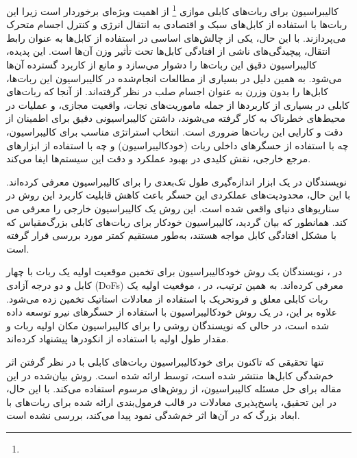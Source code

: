  کالیبراسیون برای ربات‌های کابلی موازی
  \footnote{}
  از اهمیت ویژه‌ای برخوردار است زیرا این ربات‌ها با استفاده از کابل‌های سبک و اقتصادی به انتقال انرژی و کنترل اجسام متحرک می‌پردازند. با این حال، یکی از چالش‌های اساسی در استفاده از کابل‌ها به عنوان رابط انتقال، پیچیدگی‌های ناشی از افتادگی کابل‌ها تحت تأثیر وزن آن‌ها است. این پدیده، کالیبراسیون دقیق این ربات‌ها را دشوار می‌سازد و مانع از کاربرد گسترده آن‌ها می‌شود. به همین دلیل در بسیاری از مطالعات انجام‌شده در کالیبراسیون این ربات‌ها، کابل‌ها را بدون وزرن به عنوان اجسام صلب در نظر گرفته‌اند. از آنجا که ربات‌های کابلی در بسیاری از کاربردها از جمله ماموریت‌های نجات، واقعیت مجازی، و عملیات در محیط‌های خطرناک به کار گرفته می‌شوند، داشتن کالیبراسیونی دقیق برای اطمینان از دقت و کارایی این ربات‌ها ضروری است. انتخاب استراتژی مناسب برای کالیبراسیون، چه با استفاده از حسگرهای داخلی ربات (خودکالیبراسیون) و چه با استفاده از ابزارهای مرجع خارجی، نقش کلیدی در بهبود عملکرد و دقت این سیستم‌ها ایفا می‌کند. 
 
نویسندگان در \cite{jin2018geometric} یک ابزار اندازه‌گیری طول تک‌بعدی را برای کالیبراسیون معرفی کرده‌اند. با این حال، محدودیت‌های عملکردی این حسگر باعث کاهش قابلیت کاربرد این روش در سناریوهای دنیای واقعی شده است. این روش یک کالیبراسیون خارجی را معرفی می کند. همانطور که بیان گردید، کالیبراسیون خودکار برای ربات‌های کابلی بزرگ‌مقیاس که با مشکل افتادگی کابل مواجه هستند، به‌طور مستقیم کمتر مورد بررسی قرار گرفته است. 

در \cite{borgstrom2009nims}، نویسندگان یک روش خودکالیبراسیون برای تخمین موقعیت اولیه یک ربات با چهار کابل و دو درجه آزادی (DoFs) معرفی کرده‌اند. به همین ترتیب، در \cite{ida2019automatic}، موقعیت اولیه یک ربات کابلی معلق و فروتحریک با استفاده از معادلات استاتیک تخمین زده می‌شود. علاوه بر این، در \cite{pott2013cable_ForceSensorCalib} یک روش خودکالیبراسیون با استفاده از حسگرهای نیرو توسعه داده شده است، در حالی که نویسندگان \cite{darvin2018initial} روشی را برای کالیبراسیون مکان اولیه ربات و مقدار طول اولیه با استفاده از انکودرها پیشنهاد کرده‌اند. 
 
تنها تحقیقی که تاکنون برای خودکالیبراسیون ربات‌های کابلی با در نظر گرفتن اثر خم‌شدگی کابل‌ها منتشر شده است، توسط \cite{an2022all} ارائه شده است. روش بیان‌شده در این مقاله برای حل مسئله کالیبراسیون، از روش‌های مرسوم استفاده می‌کند. با این حال، در این تحقیق، پاسخ‌پذیری معادلات در قالب فرمول‌بندی ارائه شده برای ربات‌های با ابعاد بزرگ که در آن‌ها اثر خم‌شدگی نمود پیدا می‌کند، بررسی نشده است.







